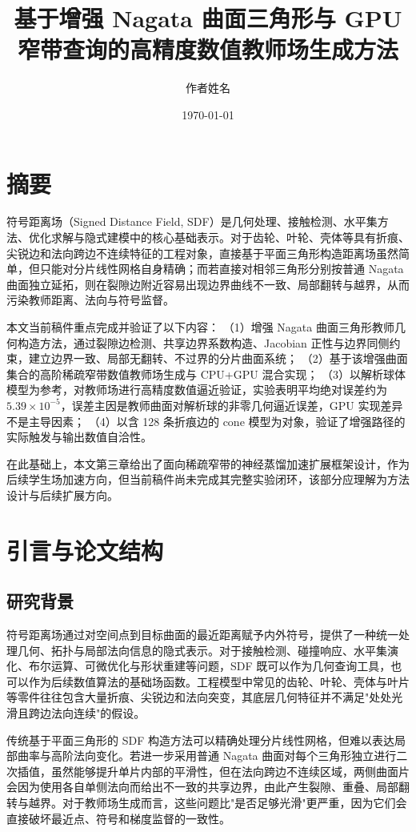 \documentclass[12pt,oneside]{ctexbook}
\title{基于增强 Nagata 曲面三角形与 GPU 窄带查询的高精度数值教师场生成方法}
\author{作者姓名}
\date{\today}
\begin{document}
\frontmatter
\maketitle

\chapter*{摘要}
符号距离场（Signed Distance Field, SDF）是几何处理、接触检测、水平集方法、优化求解与隐式建模中的核心基础表示。对于齿轮、叶轮、壳体等具有折痕、尖锐边和法向跨边不连续特征的工程对象，直接基于平面三角形构造距离场虽然简单，但只能对分片线性网格自身精确；而若直接对相邻三角形分别按普通 Nagata 曲面独立延拓，则在裂隙边附近容易出现边界曲线不一致、局部翻转与越界，从而污染教师距离、法向与符号监督。

本文当前稿件重点完成并验证了以下内容：
（1）增强 Nagata 曲面三角形教师几何构造方法，通过裂隙边检测、共享边界系数构造、Jacobian 正性与边界同侧约束，建立边界一致、局部无翻转、不过界的分片曲面系统；
（2）基于该增强曲面集合的高阶稀疏窄带数值教师场生成与 CPU+GPU 混合实现；
（3）以解析球体模型为参考，对教师场进行高精度数值逼近验证，实验表明平均绝对误差约为 $5.39\times10^{-5}$，误差主因是教师曲面对解析球的非零几何逼近误差，GPU 实现差异不是主导因素；
（4）以含 128 条折痕边的 cone 模型为对象，验证了增强路径的实际触发与输出数值自洽性。

在此基础上，本文第三章给出了面向稀疏窄带的神经蒸馏加速扩展框架设计，作为后续学生场加速方向，但当前稿件尚未完成其完整实验闭环，该部分应理解为方法设计与后续扩展方向。
\tableofcontents

\mainmatter

\chapter{引言与论文结构}
\section{研究背景}
符号距离场通过对空间点到目标曲面的最近距离赋予内外符号，提供了一种统一处理几何、拓扑与局部法向信息的隐式表示。对于接触检测、碰撞响应、水平集演化、布尔运算、可微优化与形状重建等问题，SDF 既可以作为几何查询工具，也可以作为后续数值算法的基础场函数。工程模型中常见的齿轮、叶轮、壳体与叶片等零件往往包含大量折痕、尖锐边和法向突变，其底层几何特征并不满足"处处光滑且跨边法向连续"的假设。

传统基于平面三角形的 SDF 构造方法可以精确处理分片线性网格，但难以表达局部曲率与高阶法向变化。若进一步采用普通 Nagata 曲面对每个三角形独立进行二次插值，虽然能够提升单片内部的平滑性，但在法向跨边不连续区域，两侧曲面片会因为使用各自单侧法向而给出不一致的共享边界，由此产生裂隙、重叠、局部翻转与越界。对于教师场生成而言，这些问题比"是否足够光滑"更严重，因为它们会直接破坏最近点、符号和梯度监督的一致性。
\end{document}
